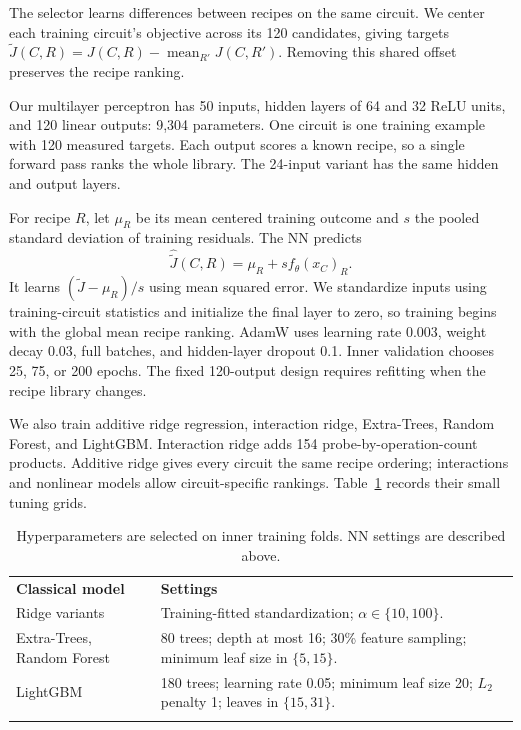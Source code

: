 \documentclass[11pt,a4paper]{article}
\newcommand{\toprule}{\hline\noalign{\smallskip}}
\newcommand{\midrule}{\noalign{\smallskip}\hline\noalign{\smallskip}}
\newcommand{\bottomrule}{\noalign{\smallskip}\hline}
\begin{document}
The selector learns differences between recipes on the same circuit. We center each training circuit's objective across its 120 candidates, giving targets $\widetilde J(C,R)=J(C,R)-\operatorname{mean}_{R'}J(C,R')$. Removing this shared offset preserves the recipe ranking.

Our multilayer perceptron has 50 inputs, hidden layers of 64 and 32 ReLU units, and 120 linear outputs: 9,304 parameters. One circuit is one training example with 120 measured targets. Each output scores a known recipe, so a single forward pass ranks the whole library. The 24-input variant has the same hidden and output layers.

For recipe $R$, let $\mu_R$ be its mean centered training outcome and $s$ the pooled standard deviation of training residuals. The NN predicts
\begin{equation}
\widehat{\widetilde J}(C,R)=\mu_R+s f_\theta(x_C)_R.
\end{equation}
It learns $(\widetilde J-\mu_R)/s$ using mean squared error. We standardize inputs using training-circuit statistics and initialize the final layer to zero, so training begins with the global mean recipe ranking. AdamW uses learning rate 0.003, weight decay 0.03, full batches, and hidden-layer dropout 0.1. Inner validation chooses 25, 75, or 200 epochs. The fixed 120-output design requires refitting when the recipe library changes.

We also train additive ridge regression, interaction ridge, Extra-Trees, Random Forest, and LightGBM. Interaction ridge adds 154 probe-by-operation-count products. Additive ridge gives every circuit the same recipe ordering; interactions and nonlinear models allow circuit-specific rankings. Table~\ref{tab:grid} records their small tuning grids.

\begin{table}[htbp]
\centering\small
\begin{tabularx}{\textwidth}{@{}p{3.4cm}X@{}}
\toprule
\textbf{Classical model} & \textbf{Settings}\\
\midrule
Ridge variants & Training-fitted standardization; $\alpha\in\{10,100\}$.\\
Extra-Trees, Random Forest & 80 trees; depth at most 16; 30\% feature sampling; minimum leaf size in $\{5,15\}$.\\
LightGBM & 180 trees; learning rate 0.05; minimum leaf size 20; $L_2$ penalty 1; leaves in $\{15,31\}$.\\
\bottomrule
\end{tabularx}
\caption{Hyperparameters are selected on inner training folds. NN settings are described above.}
\label{tab:grid}
\end{table}
\end{document}
